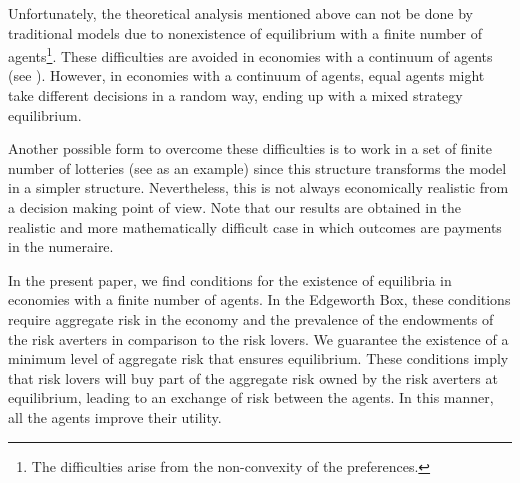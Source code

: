 \documentclass[pdftex]{article}
\numberwithin{equation}{section}
\theoremstyle{th}
\newtheorem{proof lemma}{{Proof Lemma}.}
\theoremstyle{definition}
\begin{document}
Unfortunately, the theoretical analysis mentioned above can not be done by traditional models due to nonexistence of equilibrium with a finite number of agents\footnote{The difficulties arise from the non-convexity of the preferences.}. These difficulties are avoided in economies with a continuum of agents (see \cite{Aumann2}). {However, in economies with a continuum of agents, equal agents might take different decisions in a random way, ending up with a mixed strategy equilibrium.}

{Another possible form to overcome these difficulties is to work in a set of finite number of lotteries (see \cite{SnowWolf} as an example) since this structure transforms the model in a simpler structure. Nevertheless, this is not always economically realistic from a decision making point of view.} Note that our results are obtained in the realistic and more mathematically difficult case in which outcomes are payments in the numeraire.




In the present paper, we find conditions for the existence of equilibria in economies with a finite number of agents. In the Edgeworth Box, these conditions require aggregate risk in the economy and the prevalence of the endowments of the risk averters in comparison to the risk lovers. We guarantee the existence of a minimum level of aggregate risk that ensures equilibrium.
These conditions imply that risk lovers will buy part of the aggregate risk owned by the risk averters at equilibrium, leading to an exchange of risk between the agents. In this manner, all the agents improve their utility.


\end{document}
